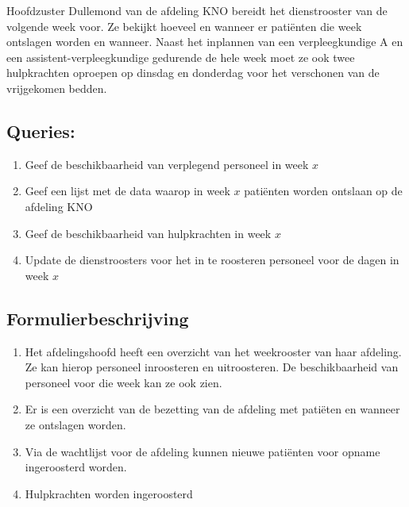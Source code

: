 
Hoofdzuster Dullemond van de afdeling KNO bereidt het dienstrooster
van de volgende week voor. Ze bekijkt hoeveel en wanneer er pati\"enten die week
ontslagen worden en wanneer. Naast het inplannen van een
verpleegkundige A en een assistent-verpleegkundige gedurende de hele
week moet ze ook twee hulpkrachten oproepen op dinsdag en donderdag
voor het verschonen van de vrijgekomen bedden.

\subsection*{Queries:}
\begin{enumerate}
  \item Geef de beschikbaarheid van verplegend personeel in week $x$
  \item Geef een lijst met de data waarop in week $x$ pati\"enten worden
  ontslaan op de afdeling KNO
  \item Geef de beschikbaarheid van hulpkrachten in week $x$
  \item Update de dienstroosters voor het in te roosteren personeel voor de dagen in week $x$
\end{enumerate}

\subsection*{Formulierbeschrijving}
\begin{enumerate}
	\item Het afdelingshoofd heeft een overzicht van het weekrooster van haar afdeling. Ze kan hierop personeel inroosteren en uitroosteren. De beschikbaarheid van personeel voor die week kan ze ook zien.
	\item Er is een overzicht van de bezetting van de afdeling met pati\"eten en wanneer ze ontslagen worden.
	\item Via de wachtlijst voor de afdeling kunnen nieuwe pati\"enten voor opname ingeroosterd worden.
	\item Hulpkrachten worden ingeroosterd 
\end{enumerate}